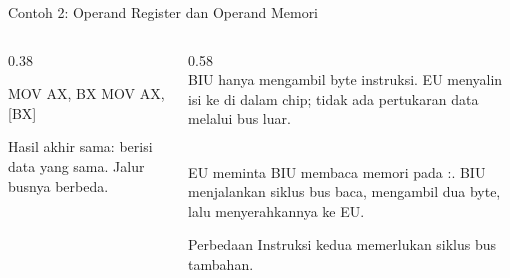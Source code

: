 \documentclass[aspectratio=169,11pt]{beamer}
\begin{document}
\begin{frame}[fragile]{Contoh 2: Operand Register dan Operand Memori}
\begin{columns}[t]
\begin{column}{0.38\textwidth}
\begin{kodeasm}[numbers=none]
MOV AX, BX
MOV AX, [BX]
\end{kodeasm}

\vspace{0.3em}
{\footnotesize\color{obeGray}Hasil akhir sama:  berisi data
yang sama. Jalur busnya berbeda.\par}
\end{column}
\begin{column}{0.58\textwidth}
\footnotesize
{\color{obeTeal}\bfseries {}}\\[0.15em]
BIU hanya mengambil byte instruksi. EU menyalin isi  ke
 di dalam chip; tidak ada pertukaran data melalui bus luar.

\vspace{0.35em}
{\color{obeMaroon}\bfseries {}}\\[0.15em]
EU meminta BIU membaca memori pada :. BIU
menjalankan siklus bus baca, mengambil dua byte, lalu menyerahkannya
ke EU.

\vspace{0.35em}
\begin{block}{Perbedaan}
\small Instruksi kedua memerlukan siklus bus tambahan.
\end{block}
\end{column}
\end{columns}
\end{frame}
\end{document}
